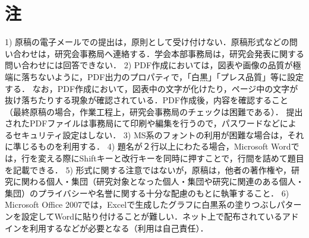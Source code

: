 \documentclass[dvipdfmx]{jset-study-group}
\begin{document}
\section{注}

1) 原稿の電子メールでの提出は，原則として受け付けない．原稿形式などの問い合わせは，研究会事務局へ連絡する．学会本部事務局は，研究会発表に関する問い合わせには回答できない．
2) PDF作成においては，図表や画像の品質が極端に落ちないように，PDF出力のプロパティで，「白黒」「プレス品質」等に設定する．
なお，PDF作成において，図表中の文字が化けたり，ページ中の文字が抜け落ちたりする現象が確認されている．PDF作成後，内容を確認すること（最終原稿の場合，作業工程上，研究会事務局のチェックは困難である）．
提出されたPDFファイルは事務局にて印刷や編集を行うので，パスワードなどによるセキュリティ設定はしない．
3) MS系のフォントの利用が困難な場合は，それに準じるものを利用する．
4) 題名が２行以上にわたる場合，Microsoft Wordでは，行を変える際にShiftキーと改行キーを同時に押すことで，行間を詰めて題目を記載できる．
5) 形式に関する注意ではないが，原稿は，他者の著作権や，研究に関わる個人・集団（研究対象となった個人・集団や研究に関連のある個人・集団）のプライバシーや名誉に関する十分な配慮のもとに執筆すること． 
6) Microsoft Office 2007では，Excelで生成したグラフに白黒系の塗りつぶしパターンを設定してWordに貼り付けることが難しい．ネット上で配布されているアドインを利用するなどが必要となる（利用は自己責任）．




\end{document}
